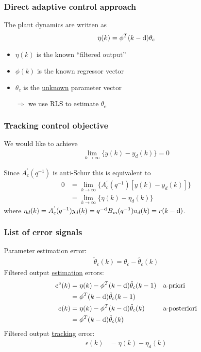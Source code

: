 \begin{frame}
    \frametitle{Direct adaptive control approach}

    The plant dynamics are written as
    \begin{align*}
        \eta(k) = \phi^T(k-\textrm{d}) \theta_c
    \end{align*}

    \begin{itemize}
        \item
        $\eta(k)$ is the known ``filtered output''

        \item
        $\phi(k)$ is the known regressor vector

        \item
        $\theta_c$ is the \underline{unknown} parameter vector
        \pause

        $\Rightarrow$ we use RLS to estimate $\theta_c$
    \end{itemize}

\end{frame}

\begin{frame}
    \frametitle{Tracking control objective}

    We would like to achieve
    \begin{align*}
        \lim_{k \rightarrow \infty} \{ y(k) - y_d(k) \} = 0
    \end{align*}
    \pause

    Since $A_c^{'}(q^{-1})$ is anti-Schur this is equivalent to
    \begin{align*}
        0 & = \lim_{k \rightarrow \infty} \{ A_c^{'}(q^{-1}) [y(k) - y_d(k)] \} \\
        & = \lim_{k \rightarrow \infty} \{ \eta(k) - \eta_d(k) \}
    \end{align*}
    where $\eta_d(k) = A_c^{'}(q^{-1}) y_d(k) = q^{-\textrm{d}} B_m(q^{-1}) u_d(k) = r(k-\textrm{d})$.
\end{frame}

\begin{frame}
    \frametitle{List of error signals}

    Parameter estimation error:
    \begin{align*}
        \tilde{\theta}_c(k) = \theta_c - \hat{\theta}_c(k)
    \end{align*}
    \pause
    Filtered output \underline{estimation} errors:
    \begin{align*}
        e^o(k) & = \eta(k) - \phi^T(k-\textrm{d}) \hat{\theta}_c(k-1)
            && \textrm{a-priori} \\
        & = \phi^T(k-\textrm{d}) \tilde{\theta}_c(k-1) \\
        e(k) & = \eta(k) - \phi^T(k-\textrm{d}) \hat{\theta}_c(k)
            && \textrm{a-posteriori} \\
        & = \phi^T(k-\textrm{d}) \tilde{\theta}_c(k)
    \end{align*}
    \pause
    Filtered output \underline{tracking} error:
    \begin{align*}
        \epsilon(k) & = \eta(k) - \eta_d(k)
    \end{align*}
\end{frame}

